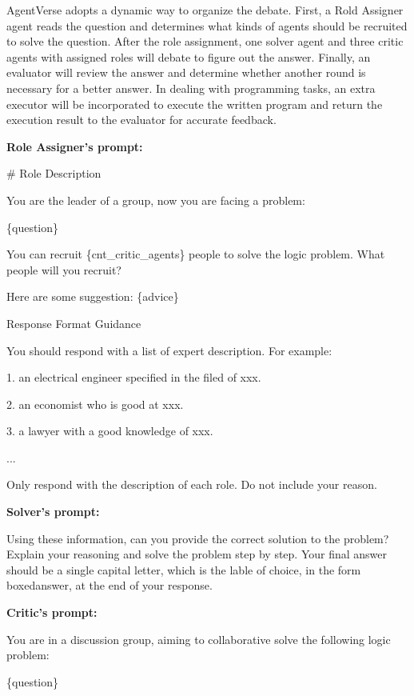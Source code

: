  AgentVerse adopts a dynamic way to organize the debate. First, a Rold Assigner agent reads the question and determines what kinds of agents should be recruited to solve the question. After the role assignment, one solver agent and three critic agents with assigned roles will debate to figure out the answer. Finally, an evaluator will review the answer and determine whether another round is necessary for a better answer. In dealing with programming tasks, an extra executor will be incorporated to execute the written program and return the execution result to the evaluator for accurate feedback.

\begin{tcolorbox}[colback=gray!10!white, colframe=black!70!white, breakable]

\textbf{Role Assigner's prompt:}

\# Role Description

You are the leader of a group, now you are facing a problem:

\{question\}


You can recruit \{cnt\_critic\_agents\} people to solve the logic problem. What people will you recruit?

Here are some suggestion:
\{advice\}

Response Format Guidance

You should respond with a list of expert description. For example:

1. an electrical engineer specified in the filed of xxx.

2. an economist who is good at xxx.

3. a lawyer with a good knowledge of xxx.

...

Only respond with the description of each role. Do not include your reason.

\textbf{Solver's prompt:}

Using these information, can you provide the correct solution to the problem? Explain your reasoning and solve the problem step by step. Your final answer should be a single capital letter, which is the lable of choice, in the form \\boxed{answer}, at the end of your response.

\textbf{Critic's prompt:}

You are in a discussion group, aiming to collaborative solve the following logic problem:

\{question\}


\end{tcolorbox}
